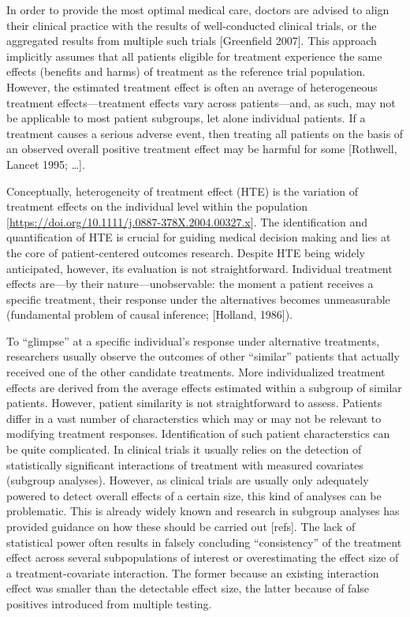 \documentclass[
]{book}
\begin{document}
In order to provide the most optimal medical care, doctors are advised to align
their clinical practice with the results of well-conducted clinical trials, or
the aggregated results from multiple such trials {[}Greenfield 2007{]}. This
approach implicitly assumes that all patients eligible for treatment experience
the same effects (benefits and harms) of treatment as the reference trial
population. However, the estimated treatment effect is often an average of
heterogeneous treatment effects---treatment effects vary across patients---and,
as such, may not be applicable to most patient subgroups, let alone individual
patients. If a treatment causes a serious adverse event, then treating all
patients on the basis of an observed overall positive treatment effect may be
harmful for some {[}Rothwell, Lancet 1995; \ldots{]}.

Conceptually, heterogeneity of treatment effect (HTE) is the variation of
treatment effects on the individual level within the population
{[}\url{https://doi.org/10.1111/j.0887-378X.2004.00327.x}{]}. The identification and
quantification of HTE is crucial for guiding medical decision making and lies at the
core of patient-centered outcomes research. Despite HTE being widely
anticipated, however, its evaluation is not straightforward. Individual
treatment effects are---by their nature---unobservable: the moment a patient
receives a specific treatment, their response under the alternatives becomes
unmeasurable (fundamental problem of causal inference; {[}Holland, 1986{]}).

To ``glimpse'' at a specific individual's response under alternative treatments,
researchers usually observe the outcomes of other ``similar'' patients that
actually received one of the other candidate treatments. More individualized
treatment effects are derived from the average effects estimated within a
subgroup of similar patients. However, patient similarity is not straightforward
to assess. Patients differ in a vast number of characterstics which may or may
not be relevant to modifying treatment responses. Identification of such patient
characterstics can be quite complicated. In clinical trials it usually relies on
the detection of statistically significant interactions of treatment with
measured covariates (subgroup analyses). However, as clinical trials are usually
only adequately powered to detect overall effects of a certain size, this kind
of analyses can be problematic. This is already widely known and research in
subgroup analyses has provided guidance on how these should be carried out
{[}refs{]}. The lack of statistical power often results in falsely concluding
``consistency'' of the treatment effect across several subpopulations of interest
or overestimating the effect size of a treatment-covariate interaction. The
former because an existing interaction effect was smaller than the detectable
effect size, the latter because of false positives introduced from multiple
testing.
\end{document}
